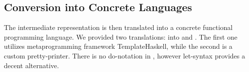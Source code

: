 \subsection{Conversion into Concrete Languages}

The intermediate representation is then translated into a concrete functional programming language.
We provided two translations: into \haskell and \ocaml.
The first one utilizes metaprogramming framework TemplateHaskell, while the second is a custom pretty-printer.
There is no do-notation in \ocaml, however let-syntax provides a decent alternative.
